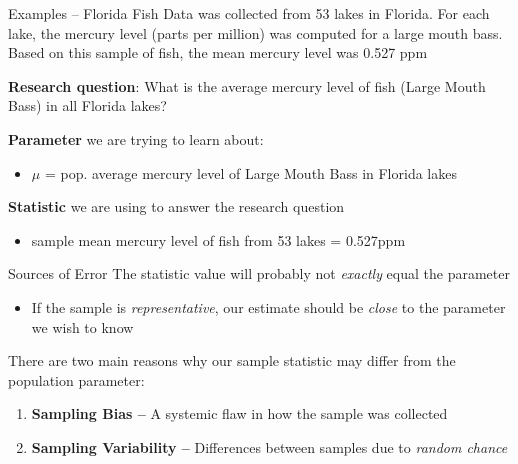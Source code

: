 \documentclass{beamer}
\begin{document}
\begin{frame}{Examples -- Florida Fish}
Data was collected from 53 lakes in Florida. For each lake, the mercury level (parts per million) was computed for a large mouth bass. Based on this sample of fish, the mean mercury level was 0.527 ppm \vspace{2mm}

\textbf{Research question}: What is the average mercury level of fish (Large Mouth Bass) in all Florida lakes? \vspace{10mm}

\textbf{Parameter} we are trying to learn about:
\begin{itemize}
    \item $\mu$ = pop. average mercury level of Large Mouth Bass in Florida lakes
\end{itemize} \vspace{3mm}

\textbf{Statistic} we are using to answer the research question
\begin{itemize}
    \item sample mean mercury level of fish from 53 lakes = 0.527ppm
\end{itemize}
\end{frame}

\begin{frame}{Sources of Error}
The statistic value will probably not \textit{exactly} equal the parameter
\begin{itemize}
    \item If the sample is \textit{representative}, our estimate should be \textit{close} to the parameter we wish to know 
\end{itemize} \vspace{14mm}

There are two main reasons why our sample statistic may differ from the population parameter: \vspace{2mm}

\begin{enumerate}
\item \textbf{Sampling Bias --} A systemic flaw in how the sample was collected
\item \textbf{Sampling Variability --} Differences between samples due to \textit{random chance}
\end{enumerate}
\end{frame}
\end{document}
